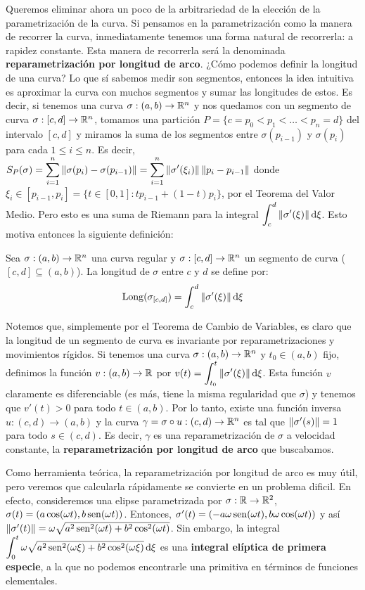 Queremos eliminar ahora un poco de la arbitrariedad de la elección de la parametrización de la curva. Si pensamos en la parametrización como la manera de recorrer la curva, inmediatamente tenemos una forma natural de recorrerla: a rapidez constante. Esta manera de recorrerla será la denominada \textbf{reparametrización por longitud de arco}. ¿Cómo podemos definir la longitud de una curva? Lo que sí sabemos medir son segmentos, entonces la idea intuitiva es aproximar la curva con muchos segmentos y sumar las longitudes de estos. Es decir, si tenemos una curva $\sigma:(a,b)\to\mathbb{R}^n$ y nos quedamos con un segmento de curva $\sigma:[c,d]\to\mathbb{R}^n$, tomamos una partición $P=\{c=p_0<p_1<\ldots <p_n=d\}$ del intervalo $[c,d]$ y miramos la suma de los segmentos entre $\sigma(p_{i-1})$ y $\sigma(p_i)$ para cada $1\leq i\leq n$. Es decir, $S_P(\sigma)=\displaystyle\sum_{i=1}^n \left\| \sigma(p_i)-\sigma(p_{i-1}) \right\|=\displaystyle\sum_{i=1}^n \left\| \sigma'(\xi_i) \right\|\left\| p_i-p_{i-1} \right\|$ donde $\xi_i\in [p_{i-1},p_i] =\{t\in [0,1] : tp_{i-1}+(1-t)p_i\}$, por el Teorema del Valor Medio. Pero esto es una suma de Riemann para la integral $\displaystyle\int_c^d \left\| \sigma'(\xi) \right\|\mathop{}\!\mathrm{d}\xi$. Esto motiva entonces la siguiente definición:

\begin{defn}
Sea $\sigma:(a,b)\to\mathbb{R}^n$ una curva regular y $\sigma:[c,d]\to\mathbb{R}^n$ un segmento de curva ($[c,d]\subseteq (a,b)$). La longitud de $\sigma$ entre $c$ y $d$ se define por: $$\mathrm{Long}(\sigma_{[c,d]}) = \int_c^d \left\| \sigma'(\xi) \right\|\mathop{}\!\mathrm{d}\xi$$
\end{defn}

Notemos que, simplemente por el Teorema de Cambio de Variables, es claro que la longitud de un segmento de curva es invariante por reparametrizaciones y movimientos rígidos. Si tenemos una curva $\sigma:(a,b)\to\mathbb{R}^n$ y $t_0\in (a,b)$ fijo, definimos la función $v:(a,b)\to\mathbb{R}$ por $v(t)=\displaystyle\int_{t_0}^t \left\| \sigma'(\xi) \right\|\mathop{}\!\mathrm{d}\xi$. Esta función $v$ claramente es diferenciable (es más, tiene la misma regularidad que $\sigma$) y tenemos que $v'(t)>0$ para todo $t\in (a,b)$. Por lo tanto, existe una función inversa $u:(c,d)\to (a,b)$ y la curva $\gamma=\sigma\circ u:(c,d)\to\mathbb{R}^n$ es tal que $\left\| \sigma'(s) \right\|=1$ para todo $s\in (c,d)$. Es decir, $\gamma$ es una reparametrización de $\sigma$ a velocidad constante, la \textbf{reparametrización por longitud de arco} que buscabamos.

Como herramienta teórica, la reparametrización por longitud de arco es muy útil, pero veremos que calcularla rápidamente se convierte en un problema dificil. En efecto, consideremos una elipse parametrizada por $\sigma:\mathbb{R}\to\mathbb{R}^2$, $\sigma(t)=(a\cos(\omega t),b\operatorname{sen}(\omega t))$. Entonces, $\sigma'(t)=(-a\omega\operatorname{sen}(\omega t),b\omega\cos(\omega t))$ y así $\left\| \sigma'(t) \right\|=\omega \sqrt{a^2\operatorname{sen}^2(\omega t) + b^2\cos^2(\omega t)}$. Sin embargo, la integral $\displaystyle\int_0^t \omega\sqrt{a^2\operatorname{sen}^2(\omega \xi)+b^2\cos^2(\omega \xi)}\mathop{}\!\mathrm{d} \xi$ es una \textbf{integral elíptica de primera especie}, a la que no podemos encontrarle una primitiva en términos de funciones elementales.

